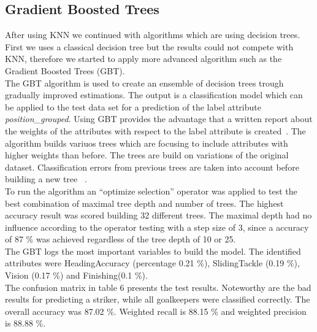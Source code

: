 \subsection{Gradient Boosted Trees}
After using KNN we continued with algorithms which are using decision trees. First we uses a classical decision tree but the results could not compete with KNN, therefore we started to apply more advanced algorithm such as the Gradient Boosted Trees (GBT).\\
The GBT algorithm is used to create an ensemble of decision trees trough gradually improved estimations. The output is a classification model which can be applied to the test data set for a prediction of the label attribute\textit{ position\_grouped}. Using GBT provides the advantage that a written report about the weights of the attributes with respect to the label attribute is created~\cite{ref_rapidminergbt}. The algorithm builds variuos trees which are focusing to include attributes with higher weights than before. The trees are build on variations of the original dataset. Classification errors from previous trees are taken into account before building a new tree ~\cite{ref_towardsGBT}.\\
To run the algorithm an ``optimize selection'' operator was applied to test the best combination of maximal tree depth and number of trees.  The highest accuracy result was scored building 32 different trees. The maximal depth had no influence according to the operator testing with a step size of 3, since a accuracy of 87 \% was achieved regardless of the tree depth of 10 or 25.\\
The GBT logs the most important variables to build the model. The identified attributes were HeadingAccuracy (percentage 0.21 \%), SlidingTackle (0.19 \%), Vision (0.17 \%) and Finishing(0.1 \%).\\
The confusion matrix in table 6 presents the test results. Noteworthy are the bad results for predicting a striker, while all goalkeepers were classified correctly. The overall accuracy was 87.02 \%. Weighted recall is 88.15 \% and weighted precision is 88.88 \%. \\

